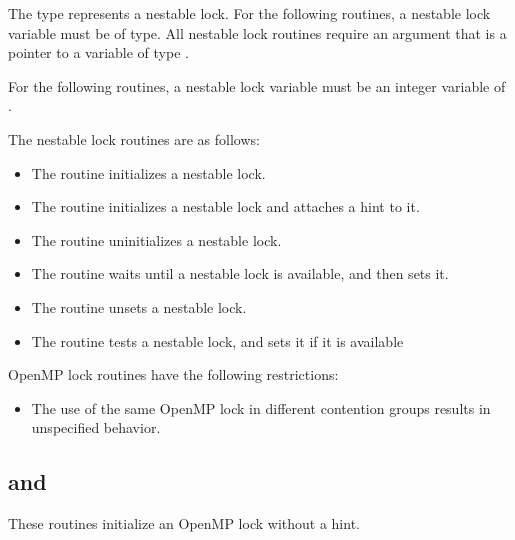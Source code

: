 \ccppspecificstart
The type  represents a nestable lock. 
For the following routines, a nestable lock variable must be of  type. 
All nestable lock routines require an argument that is a pointer to a variable of type 
.
\ccppspecificend

\fortranspecificstart
For the following routines, a nestable lock variable must be an integer variable of 
.
\fortranspecificend

The nestable lock routines are as follows:

\begin{itemize}
\item The  routine initializes a nestable lock.

\item The  routine initializes a nestable lock and attaches a hint to it.

\item The  routine uninitializes a nestable lock.

\item The  routine waits until a nestable lock is available, and then 
sets it.

\item The  routine unsets a nestable lock.

\item The  routine tests a nestable lock, and sets it if it is 
available
\end{itemize}

\restrictions
OpenMP lock routines have the following restrictions:

\begin{itemize}
\item The use of the same OpenMP lock in different contention groups results in 
unspecified behavior. 
\end{itemize}










\subsection{ and }
\label{subsec:omp_init_lock and omp_init_nest_lock}
\summary
These routines initialize an OpenMP lock without a hint.

